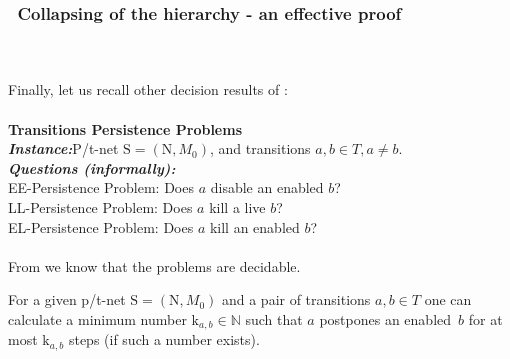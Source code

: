 \documentclass[a4paper]{llncs}
\begin{document}
\subsubsection{\textbullet \ Collapsing of the hierarchy - an effective proof}\mbox{ }\\
\\
Finally, let us recall other decision results of \cite{BarOch}:
\\ \\
\textbf{Transitions Persistence Problems}
\\
\indent\textbf{\emph{Instance:}}P/t-net $\mathrm{S}=(\mathrm{N}, M_0)$, and transitions $a,b\in T, a\neq b$.\\
\indent\textbf{\emph{Questions (informally):}}\\
\indent \indent\indent EE-Persistence Problem: Does $a$ disable an enabled $b$?\\
\indent \indent\indent LL-Persistence Problem: Does $a$ kill a live $b$?\\
\indent \indent \indent EL-Persistence Problem: Does $a$ kill an enabled $b$?\\
\\
From \cite{BarOch} we know that the problems are decidable.

\begin{theorem}
\label{t419}
For a given p/t-net $\mathrm{S}=(\mathrm{N},M_0)$ and a pair of transitions $a,b\in T$ one can calculate a minimum number $\mathrm{k}_{a,b}\in \mathbb{N}$ such that $a$ postpones an enabled~$b$ for at most $\mathrm{k}_{a,b}$ steps (if such a number exists).
\end{theorem}
\end{document}
